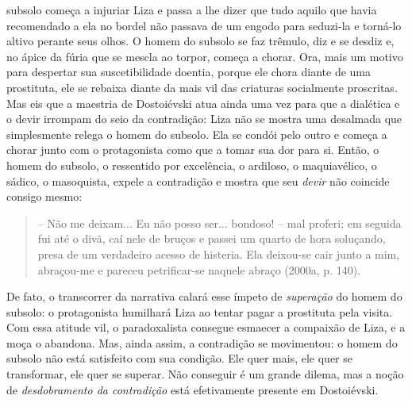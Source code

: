 subsolo começa a injuriar Liza e passa a lhe dizer que tudo aquilo que
havia recomendado a ela no bordel não passava de um engodo para
seduzi-la e torná-lo altivo perante seus olhos. O homem do subsolo se
faz trêmulo, diz e se desdiz e, no ápice da fúria que se mescla ao
torpor, começa a chorar. Ora, mais um motivo para despertar sua
suscetibilidade doentia, porque ele chora diante de uma prostituta, ele
se rebaixa diante da mais vil das criaturas socialmente proscritas. Mas
eis que a maestria de Dostoiévski atua ainda uma vez para que a
dialética e o devir irrompam do seio da contradição: Liza não se mostra
uma desalmada que simplesmente relega o homem do subsolo. Ela se condói
pelo outro e começa a chorar junto com o protagonista como que a tomar
sua dor para si. Então, o homem do subsolo, o ressentido por excelência,
o ardiloso, o maquiavélico, o sádico, o masoquista, expele a contradição
e mostra que seu \emph{devir} não coincide consigo mesmo:

\begin{quote}
-- Não me deixam... Eu não posso ser... bondoso! -- mal proferi; em
seguida fui até o divã, caí nele de bruços e passei um quarto de hora
soluçando, presa de um verdadeiro acesso de histeria. Ela deixou-se cair
junto a mim, abraçou-me e pareceu petrificar-se naquele abraço (2000a,
p. 140).
\end{quote}

De fato, o transcorrer da narrativa calará esse ímpeto de
\emph{superação} do homem do subsolo: o protagonista humilhará Liza ao
tentar pagar a prostituta pela visita. Com essa atitude vil, o
paradoxalista consegue esmaecer a compaixão de Liza, e a moça o
abandona. Mas, ainda assim, a contradição se movimentou: o homem do
subsolo não está satisfeito com sua condição. Ele quer mais, ele quer se
transformar, ele quer se superar. Não conseguir é um grande dilema, mas
a noção de \emph{desdobramento da contradição} está efetivamente
presente em Dostoiévski.

